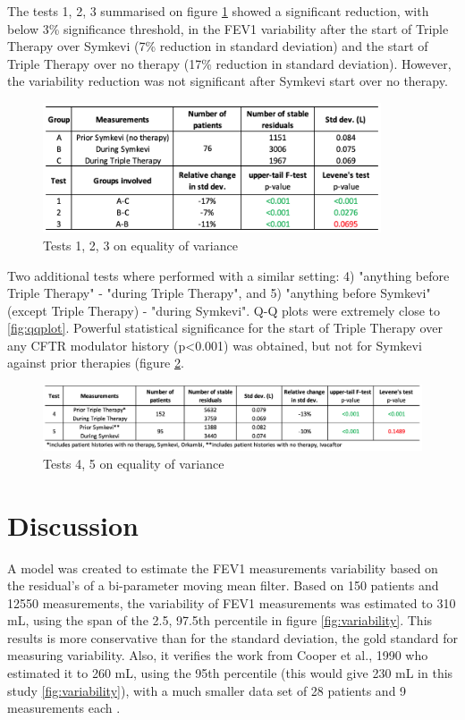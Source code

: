 The tests 1, 2, 3 summarised on figure \ref{fig:hptests} showed a significant reduction, with below 3\% significance threshold, in the FEV1 variability after the start of Triple Therapy over  Symkevi (7\% reduction in standard deviation) and the start of Triple Therapy over no therapy (17\% reduction in standard deviation). However, the variability reduction was not significant after Symkevi start over no therapy. 

\begin{figure}[!h]
    \centering
    \includegraphics[width=100mm]{images/tests.png}
    \caption{Tests 1, 2, 3 on equality of variance}
    \label{fig:hptests}
\end{figure}

Two additional tests where performed with a similar setting: 4) "anything before Triple Therapy" - "during Triple Therapy", and 5) "anything before Symkevi" (except Triple Therapy) - "during Symkevi". Q-Q plots were extremely close to \ref{fig:qqplot}. Powerful statistical significance for the start of Triple Therapy over any CFTR modulator history (p<0.001) was obtained, but not for Symkevi against prior therapies (figure \ref{fig:hptests2}.

\begin{figure}[!h]
    \centering
    \includegraphics[width=150mm]{images/hptests2.png}
    \caption{Tests 4, 5 on equality of variance}
    \label{fig:hptests2}
\end{figure}


\section{Discussion}
A model was created to estimate the FEV1 measurements variability based on the residual's of a bi-parameter moving mean filter. Based on 150 patients and 12550 measurements, the variability of FEV1 measurements was estimated to 310 mL, using the span of the 2.5, 97.5th percentile in figure \ref{fig:variability}. This results is more conservative than for the standard deviation, the gold standard for measuring variability. Also, it verifies the work from Cooper et al., 1990 who estimated it to 260 mL, using the 95th percentile (this would give 230 mL in this study \ref{fig:variability}), with a much smaller data set of 28 patients and 9 measurements each \cite{cooper_1990}.

